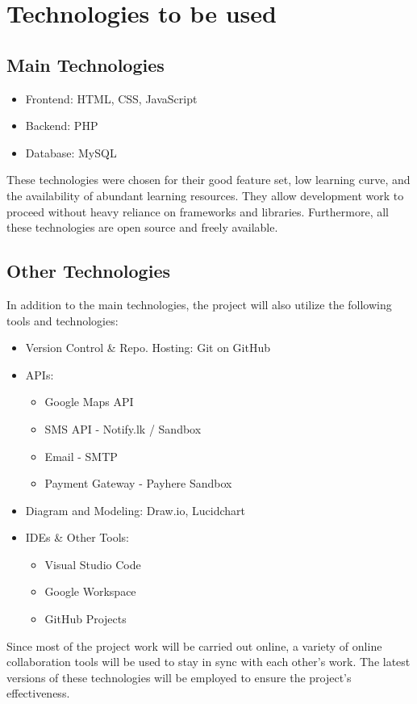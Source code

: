 \section{Technologies to be used}

\subsection{Main Technologies}

\begin{itemize}
\itemsep0em 
    \item Frontend: HTML, CSS, JavaScript
    \item Backend: PHP
    \item Database: MySQL
\end{itemize}

These technologies were chosen for their good feature set, low learning curve, and the availability of abundant learning resources. They allow development work to proceed without heavy reliance on frameworks and libraries. Furthermore, all these technologies are open source and freely available.

\subsection{Other Technologies}
In addition to the main technologies, the project will also utilize the following tools and technologies:

\begin{itemize}
    \item Version Control \& Repo. Hosting: Git on GitHub
    \item APIs:
    \begin{itemize}
    \itemsep0em 
        \item Google Maps API
        \item SMS API - Notify.lk / Sandbox
        \item Email - SMTP
        \item Payment Gateway - Payhere Sandbox
    \end{itemize}
    \item Diagram and Modeling: Draw.io, Lucidchart
    \item IDEs \& Other Tools:
    \begin{itemize}
    \itemsep0em 
        \item Visual Studio Code
        \item Google Workspace
        \item GitHub Projects
    \end{itemize}
\end{itemize}

Since most of the project work will be carried out online, a variety of online collaboration tools will be used to stay in sync with each other's work. The latest versions of these technologies will be employed to ensure the project's effectiveness.

